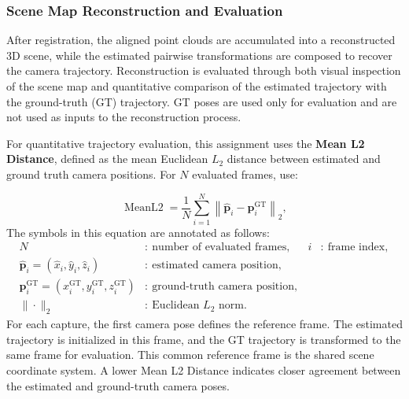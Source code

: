 \documentclass[11pt]{article}
\begin{document}

\subsubsection{Scene Map Reconstruction and  Evaluation}

After registration, the aligned point clouds are accumulated into a reconstructed 3D scene, while the estimated pairwise transformations are composed to recover the camera trajectory. Reconstruction is evaluated through both visual inspection of the scene map and quantitative comparison of the estimated trajectory with the ground-truth (GT) trajectory. GT poses are used only for evaluation and are not used as inputs to the reconstruction process.

For quantitative trajectory evaluation, this assignment uses the \textbf{Mean L2 Distance}, defined as the mean Euclidean $L_2$ distance between estimated and ground truth camera positions. For $N$ evaluated frames, use:

\vspace{-1em}
\[
\operatorname{MeanL2}=\frac{1}{N}\sum_{i=1}^{N}\left\|\hat{\mathbf p}_i-\mathbf p_i^{\mathrm{GT}}\right\|_2,
\]
The symbols in this equation are annotated as follows:
\[
\begin{aligned}
N &:\ \text{number of evaluated frames}, & i &:\ \text{frame index},\\
\hat{\mathbf p}_i=(\hat{x}_i,\hat{y}_i,\hat{z}_i) &:\ \text{estimated camera position},\\
\mathbf p_i^{\mathrm{GT}}=(x_i^{\mathrm{GT}},y_i^{\mathrm{GT}},z_i^{\mathrm{GT}}) &:\ \text{ground-truth camera position},\\
\|\cdot\|_2 &:\ \text{Euclidean }L_2\text{ norm}.
\end{aligned}
\]
For each capture, the first camera pose defines the reference frame. The estimated trajectory is initialized in this frame, and the GT trajectory is transformed to the same frame for evaluation. This common reference frame is the shared scene coordinate system. A lower Mean L2 Distance indicates closer agreement between the estimated and ground-truth camera poses.
\end{document}
